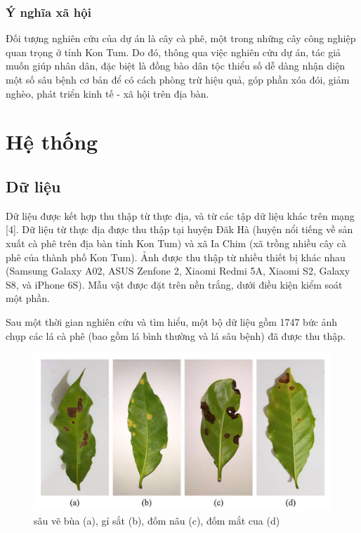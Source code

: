 \documentclass[a4paper,14pt]{extarticle}
\begin{document}
		\subsubsection{Ý nghĩa xã hội}
		Đối tượng nghiên cứu của dự án là cây cà phê, một trong những cây công nghiệp quan trọng ở tỉnh Kon Tum. Do đó, thông qua việc nghiên cứu dự án, tác giả muốn giúp nhân dân, đặc biệt là đồng bào dân tộc thiểu số dễ dàng nhận diện một số sâu bệnh cơ bản để có cách phòng trừ hiệu quả, góp phần xóa đói, giảm nghèo, phát triển kinh tế - xã hội trên địa bàn.

\section{Hệ thống}
	\subsection{Dữ liệu}
	Dữ liệu được kết hợp thu thập từ thực địa, và từ các tập dữ liệu khác trên mạng [4]. Dữ liệu từ thực địa được thu thập tại huyện Đăk Hà (huyện nổi tiếng về sản xuất cà phê trên địa bàn tỉnh Kon Tum) và xã Ia Chim (xã trồng nhiều cây cà phê của thành phố Kon Tum). Ảnh được thu thập từ nhiều thiết bị khác nhau (Samsung Galaxy A02, ASUS Zenfone 2, Xiaomi Redmi 5A, Xiaomi S2, Galaxy S8, và iPhone 6S). Mẫu vật được đặt trên nền trắng, dưới điều kiện kiểm soát một phần.

	Sau một thời gian nghiên cứu và tìm hiểu, một bộ dữ liệu gồm 1747 bức ảnh chụp các lá cà phê (bao gồm lá bình thường và lá sâu bệnh) đã được thu thập.

	\begin{figure}[H]
		\centering
		\includegraphics[scale=0.35]{images/image1}
		\caption{sâu vẽ bùa (a), gỉ sắt (b), đốm nâu (c), đốm mắt cua (d)}
	\end{figure}
\end{document}
